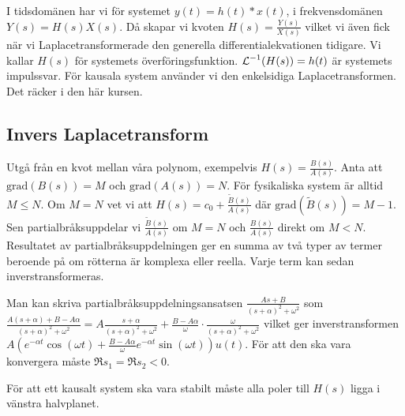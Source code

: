\documentclass[a4paper]{article}
\begin{document}
I tidsdomänen har vi för systemet \(
    y(t) = h(t) * x(t)
\), i frekvensdomänen \(
    Y(s) = H(s)X(s)
\). Då skapar vi kvoten \(
    H(s) = \frac{Y(s)}{X(s)} 
\) vilket vi även fick när vi Laplacetransformerade den generella 
differentialekvationen tidigare. Vi kallar \(
    H(s)
\) för systemets överföringsfunktion. \(
    \operatorname{\mathcal{L}}^{-1}(H(s)) = h(t)
\) är systemets impulssvar. För kausala system använder vi den enkelsidiga
Laplacetransformen. Det räcker i den här kursen. 

\subsection{Invers Laplacetransform}
Utgå från en kvot mellan våra polynom, exempelvis \(
    H(s) = \frac{B(s)}{A(s)} 
\). Anta att \(
    \text{grad}(B(s)) = M
\) och \(
    \text{grad}(A(s)) = N 
\). För fysikaliska system är alltid \(
    M \leq N
\). Om \(
    M = N
\) vet vi att \(
    H(s) = c_0 + \frac{\widetilde{B}(s)}{A(s)} 
\) där \(
    \text{grad}(\widetilde{B}(s)) = M-1
\). Sen partialbråksuppdelar vi \(
    \frac{\widetilde{B}(s)}{A(s)} 
\) om \(
    M=N
\) och \(
    \frac{B(s)}{A(s)} 
\) direkt om \(
    M < N
\). Resultatet av partialbråksuppdelningen ger en summa av två typer av 
termer beroende på om rötterna är komplexa eller reella. Varje term kan 
sedan inverstransformeras. 

Man kan skriva partialbråksuppdelningsansatsen \(
    \frac{As+B}{{(s+\alpha)}^2 + \omega^2} 
\) som \(
    \frac{A(s+\alpha) + B - A \alpha}{{(s+\alpha)}^2 + \omega^2}
    = A \frac{s+\alpha}{{(s+\alpha)}^2 + \omega^2} + \frac{B-A\alpha}{\omega} \cdot \frac{\omega}{{(s+\alpha)}^2 + \omega^2}  
\) vilket ger inverstransformen \(
    A \left( e^{-\alpha t} \cos(\omega t) + \frac{B-A\alpha}{\omega} e^{-\alpha t} \sin(\omega t) \right) u(t)
\). För att den ska vara konvergera måste \(
    \Re{s_1} = \Re{s_2} < 0
\).

För att ett kausalt system ska vara stabilt måste alla poler till \(
    H(s)
\) ligga i vänstra halvplanet. 
\end{document}
